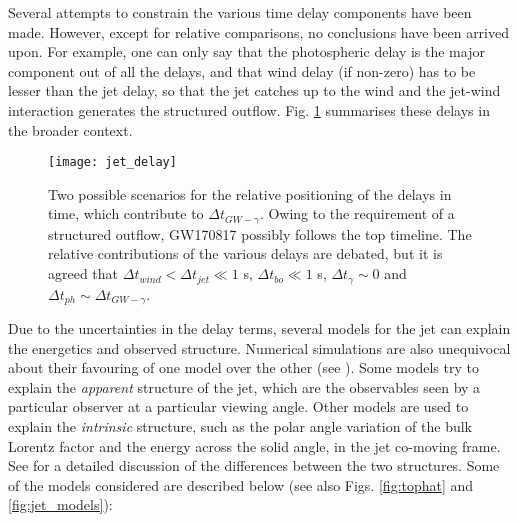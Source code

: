     Several attempts to constrain the various time delay components have been made.
    However, except for relative comparisons, no conclusions have been arrived upon.
    For example, one can only say that the photospheric delay is the major component out
    of all the delays, and that wind delay (if non-zero) has to be lesser than the jet
    delay, so that the jet catches up to the wind and the jet-wind interaction generates
    the structured outflow. Fig. \ref{fig:jet_delay} summarises these delays in the
    broader context.

    \begin{figure}[H]
        \centering
        \texttt{[image: jet\_delay]}
        \caption[Relative Positions of Jet Delays]
             {
                    Two possible scenarios for the relative positioning of the delays in
                    time, which contribute to $\Delta t_{GW-\gamma}$.  Owing to the
                    requirement of a structured outflow, GW170817 possibly follows the
                    top timeline. The relative contributions of the various delays are
                    debated, but it is agreed that $\Delta t_{wind} < \Delta t_{jet} \ll
                    1$ s, $\Delta t_{bo} \ll 1$ s, $\Delta t_{\gamma} \sim 0$ and
                    $\Delta t_{ph} \sim \Delta t_{GW-\gamma}$.
             }
        \label{fig:jet_delay}
    \end{figure}

    Due to the uncertainties in the delay terms, several models for the jet can explain
    the energetics and observed structure. Numerical simulations are also unequivocal
    about their favouring of one model over the other (see \cite{shibata_2019}).
    Some models try to explain the \textit{apparent} structure of the jet, which are the
    observables seen by a particular observer at a particular viewing angle. Other
    models are used to explain the \textit{intrinsic} structure, such as the polar angle
    variation of the bulk Lorentz factor and the energy across the solid angle, in the
    jet co-moving frame. See \cite{salafia_2015} for a detailed discussion of
    the differences between the two structures. Some of the models considered are
    described below (see also Figs. \ref{fig:tophat} and \ref{fig:jet_models}):

